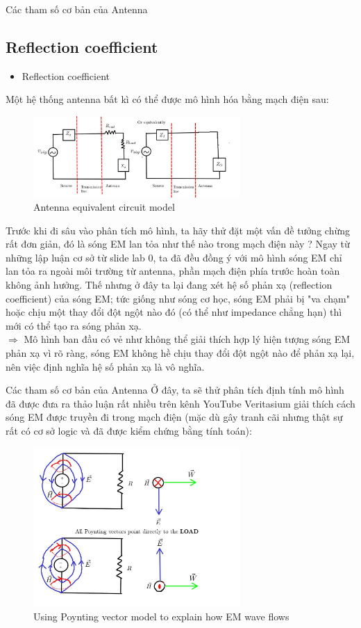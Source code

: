 \documentclass[8pt]{beamer}
\begin{document}
\begin{frame}{Các tham số cơ bản của Antenna}
\subsection{Reflection coefficient}
\begin{itemize}
\item Reflection coefficient
\end{itemize}
Một hệ thống antenna bất kì có thể được mô hình hóa bằng mạch điện sau:
\begin{figure}[h]
			\includegraphics[width=0.7\textwidth]{circuit.jpg}
			\caption{Antenna equivalent circuit model}			\label{fig:re2}
\end{figure}
Trước khi đi sâu vào phân tích mô hình, ta hãy thử đặt một vấn đề tưởng chừng rất đơn giản, đó là sóng EM lan tỏa như thế nào trong mạch điện này ? Ngay từ những lập luận cơ sở từ slide lab 0, ta đã đều đồng ý với mô hình sóng EM chỉ lan tỏa ra ngoài môi trường từ antenna, phần mạch điện phía trước hoàn toàn không ảnh hưởng. Thế nhưng ở đây ta lại đang xét hệ số phản xạ (reflection coefficient) của sóng EM; tức giống như sóng cơ học, sóng EM phải bị "va chạm" hoặc chịu một thay đổi đột ngột nào đó (có thể như impedance chẳng hạn) thì mới có thể tạo ra sóng phản xạ. 
\\$\Rightarrow$ Mô hình ban đầu có vẻ như không thể giải thích hợp lý hiện tượng sóng EM phản xạ vì rõ ràng, sóng EM không hề chịu thay đổi đột ngột nào để phản xạ lại, nên việc định nghĩa hệ số phản xạ là vô nghĩa.
\end{frame}
\begin{frame}{Các tham số cơ bản của Antenna}
Ở đây, ta sẽ thử phân tích định tính mô hình đã được đưa ra thảo luận rất nhiều trên kênh YouTube Veritasium giải thích cách sóng EM được truyền đi trong mạch điện (mặc dù gây tranh cãi nhưng thật sự rất có cơ sở logic và đã được kiểm chứng bằng tính toán): 
\begin{figure}[h]
			\includegraphics[width=0.7\textwidth]{poynting.jpg}
			\caption{Using Poynting vector model to explain how EM wave flows}			\label{fig:re2}
		\end{figure}
\end{frame}
\end{document}
